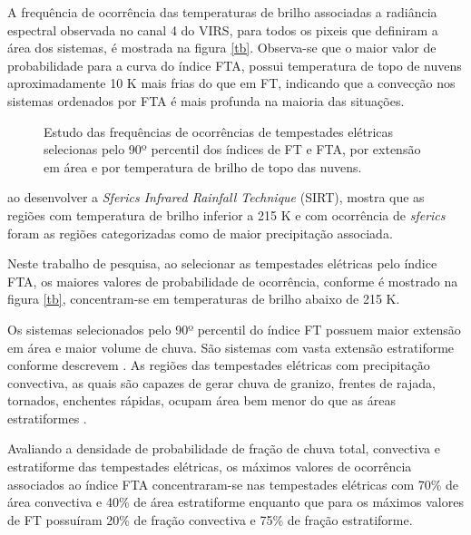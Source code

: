 A frequência de ocorrência das temperaturas de brilho associadas a radiância espectral observada no canal 4 do VIRS, para todos os pixeis que definiram a área dos sistemas, é mostrada na figura \ref{tb}. Observa-se que o maior valor de probabilidade para a curva do índice FTA, possui temperatura de topo de nuvens aproximadamente 10 K mais frias do que em FT, indicando que a convecção nos sistemas ordenados por FTA é mais profunda na maioria das situações.

\begin{figure}
  \label{t_tb}
  \caption{Estudo das frequências de ocorrências de tempestades elétricas selecionas pelo 90º percentil dos índices de FT e FTA, por extensão em área e por temperatura de brilho de topo das nuvens.}
\end{figure}


 ao desenvolver a \textit{Sferics Infrared Rainfall Technique} (SIRT), mostra que as regiões com temperatura de brilho inferior a 215 K e com ocorrência de \textit{sferics} foram as regiões categorizadas como de maior precipitação associada.

Neste trabalho de pesquisa, ao selecionar as tempestades elétricas pelo índice FTA, os maiores valores de probabilidade de ocorrência, conforme é mostrado na figura \ref{tb}, concentram-se em temperaturas de brilho abaixo de 215 K.

Os sistemas selecionados pelo 90º percentil do índice FT possuem maior extensão em área e maior volume de chuva. São sistemas com vasta extensão estratiforme conforme descrevem . As regiões das tempestades elétricas com precipitação convectiva, as quais são capazes de gerar chuva de granizo, frentes de rajada, tornados, enchentes rápidas, ocupam área bem menor do que as áreas estratiformes \cite{Jr2007}.

Avaliando a densidade de probabilidade de fração de chuva total, convectiva e estratiforme das tempestades elétricas, os máximos valores de ocorrência associados ao índice FTA concentraram-se nas tempestades elétricas com 70\% de área convectiva e 40\% de área estratiforme enquanto que para os máximos valores de FT possuíram 20\% de fração convectiva e 75\% de fração estratiforme.


